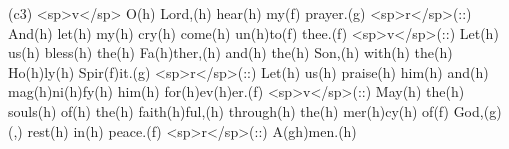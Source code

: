 (c3) <sp>v</sp> O(h) Lord,(h) hear(h) my(f) prayer.(g) <sp>r</sp>(::) And(h) let(h) my(h) cry(h) come(h) un(h)to(f) thee.(f) <sp>v</sp>(::) Let(h) us(h) bless(h) the(h) Fa(h)ther,(h) and(h) the(h) Son,(h) with(h) the(h) Ho(h)ly(h) Spir(f)it.(g) <sp>r</sp>(::) Let(h) us(h) praise(h) him(h) and(h) mag(h)ni(h)fy(h) him(h) for(h)ev(h)er.(f) <sp>v</sp>(::) May(h) the(h) souls(h) of(h) the(h) faith(h)ful,(h) through(h) the(h) mer(h)cy(h) of(f) God,(g) (,) rest(h) in(h) peace.(f) <sp>r</sp>(::) A(gh)men.(h)